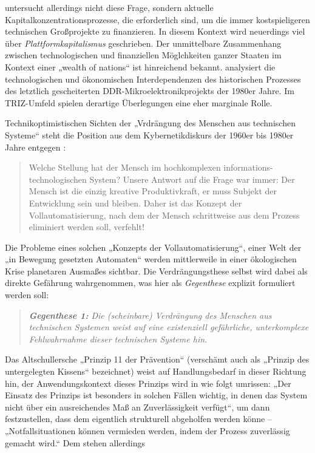 \documentclass[11pt,a4paper]{article}
\begin{document}
\cite{Goldberg2016} untersucht allerdings nicht diese Frage, sondern aktuelle
Kapitalkonzentrationsprozesse, die erforderlich sind, um die immer
kostspieligeren technischen Großprojekte zu finanzieren.  In diesem Kontext
wird neuerdings viel über \emph{Plattformkapitalismus} geschrieben.  Der
unmittelbare Zusammenhang zwischen technologischen und finanziellen
Möglchkeiten ganzer Staaten im Kontext einer „wealth of nations“ ist
hinreichend bekannt. \cite{Barkleit2000}  analysiert die technologischen und
ökonomischen Interdependenzen des historischen Prozesses des letztlich
gescheiterten DDR-Mikroelektronikprojekts der 1980er Jahre. Im TRIZ-Umfeld
spielen derartige Überlegungen eine eher marginale Rolle.

Technikoptimistischen Sichten der „Vrdrängung des Menschen aus technischen
Systeme“ steht die Position aus dem Kybernetikdiskurs der 1960er bis 1980er
Jahre entgegen \cite[S. 10]{KFK2000}:
\begin{quote}
  Welche Stellung hat der Mensch im hochkomplexen informations-technologischen
  System? Unsere Antwort auf die Frage war immer: Der Mensch ist die einzig
  kreative Produktivkraft, er muss Subjekt der Entwicklung sein und bleiben.
  Daher ist das Konzept der Vollautomatisierung, nach dem der Mensch
  schrittweise aus dem Prozess eliminiert werden soll, verfehlt!
\end{quote}
Die Probleme eines solchen „Konzepts der Vollautomatisierung“, einer Welt der
„in Bewegung gesetzten Automaten“ werden mittlerweile in einer ökologischen
Krise planetaren Ausmaßes sichtbar. Die Verdrängungsthese selbst wird dabei
als direkte Gefährung wahrgenommen, was hier als \emph{Gegenthese} explizit
formuliert werden soll:
\begin{quote}\it
  \textbf{Gegenthese 1:} Die (scheinbare) Verdrängung des Menschen aus
  technischen Systemen weist auf eine existenziell gefährliche, unterkomplexe
  Fehlwahrnahme dieser technischen Systeme hin.
\end{quote}
Das Altschullersche „Prinzip 11 der Prävention“ (verschämt auch als „Prinzip
des untergelegten Kissens“ bezeichnet) weist auf Handlungsbedarf in dieser
Richtung hin, der Anwendungskontext dieses Prinzips wird in \cite{TT} wie
folgt umrissen: „Der Einsatz des Prinzips ist besonders in solchen Fällen
wichtig, in denen das System nicht über ein ausreichendes Maß an
Zuverlässigkeit verfügt“, um dann festzustellen, dass dem eigentlich
strukturell abgeholfen werden könne -- „Notfallsituationen können vermieden
werden, indem der Prozess zuverlässig gemacht wird.“ Dem stehen allerdings
\end{document}
